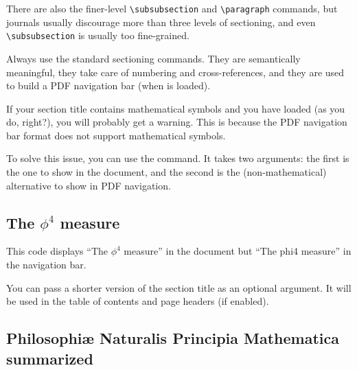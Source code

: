 There are also the finer-level \verb|\subsubsection| and \verb|\paragraph| commands,
but journals usually discourage more than three levels of sectioning,
and even \verb|\subsubsection| is usually too fine-grained.

\begin{practices}
Always use the standard sectioning commands.
They are semantically meaningful,
they take care of numbering and cross-references,
and they are used to build a PDF navigation bar (when  is loaded).
\end{practices}

\begin{gotcha}
If your section title contains mathematical symbols
and you have  loaded (as you do, right?),
you will probably get a warning.
This is because the PDF navigation bar format does not support mathematical symbols.

To solve this issue, you can use the  command.
It takes two arguments: the first is the one to show in the document,
and the second is the (non-mathematical) alternative to show in PDF navigation.
\begin{ExampleCode}
\section{The \texorpdfstring{$\phi^4$}{phi4} measure}
\end{ExampleCode}
This code displays ``The $\phi^4$ measure'' in the document
but ``The phi4 measure'' in the navigation bar.
\end{gotcha}

You can pass a shorter version of the section title as an optional argument.
It will be used in the table of contents and page headers (if enabled).
\begin{ExampleCode}
\section[Principia summarized]{Philosophi\ae{} Naturalis
                               Principia Mathematica summarized}
\end{ExampleCode}

